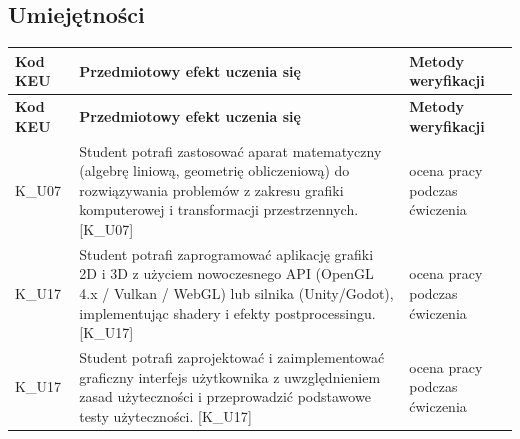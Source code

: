 \documentclass[12pt, a4paper]{article}
\newcommand{\thdrule}{\noalign{\global\setlength{\extrarowheight}{0pt}}}
\newcommand{\thdend}{\noalign{\global\setlength{\extrarowheight}{3pt}}}
\begin{document}
\subsection*{Umiejętności}
{\scriptsize
\begin{longtable}{m{1.6cm}m{9.0cm}m{4.2cm}}
\thdrule\toprule
\rowcolor{pjatkRed} {\color{white}\footnotesize\textbf{\vphantom{Ag}Kod KEU}} & {\color{white}\footnotesize\textbf{\vphantom{Ag}Przedmiotowy efekt uczenia się}} & {\color{white}\footnotesize\textbf{\vphantom{Ag}Metody weryfikacji}} \\
\midrule\thdend
\endfirsthead
\thdrule\toprule
\rowcolor{pjatkRed} {\color{white}\footnotesize\textbf{\vphantom{Ag}Kod KEU}} & {\color{white}\footnotesize\textbf{\vphantom{Ag}Przedmiotowy efekt uczenia się}} & {\color{white}\footnotesize\textbf{\vphantom{Ag}Metody weryfikacji}} \\
\midrule\thdend
\endhead
  \rowcolor{tableRowLight} K\_U07 & Student potrafi zastosować aparat matematyczny (algebrę liniową, geometrię obliczeniową) do rozwiązywania problemów z zakresu grafiki komputerowej i transformacji przestrzennych. {[}K\_U07{]} & ocena pracy podczas ćwiczenia \\
  \rowcolor{tableRowAlt} K\_U17 & Student potrafi zaprogramować aplikację grafiki 2D i 3D z użyciem nowoczesnego API (OpenGL 4.x / Vulkan / WebGL) lub silnika (Unity/Godot), implementując shadery i efekty postprocessingu. {[}K\_U17{]} & ocena pracy podczas ćwiczenia \\
  \rowcolor{tableRowLight} K\_U17 & Student potrafi zaprojektować i zaimplementować graficzny interfejs użytkownika z uwzględnieniem zasad użyteczności i przeprowadzić podstawowe testy użyteczności. {[}K\_U17{]} & ocena pracy podczas ćwiczenia \\
\bottomrule
\end{longtable}}
\end{document}

